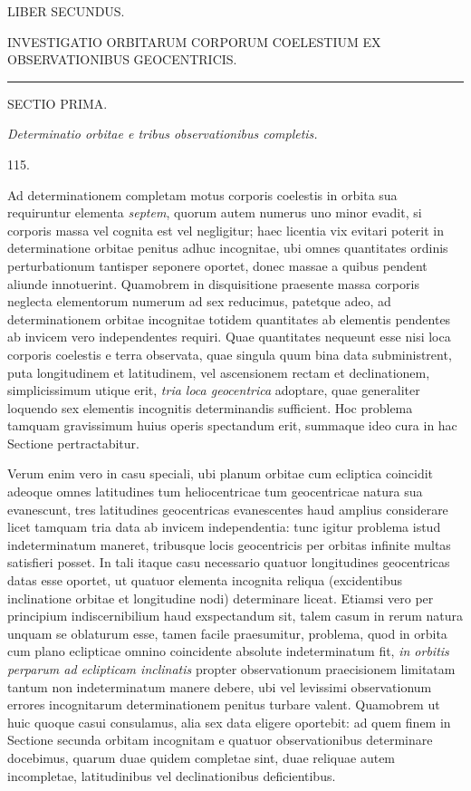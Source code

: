 \clearpage
{}
\begin{center}
{\Large LIBER SECUNDUS.}\par\bigskip
{\large INVESTIGATIO ORBITARUM CORPORUM COELESTIUM EX OBSERVATIONIBUS GEOCENTRICIS.}\par\bigskip
\rule{3em}{.3pt}\par\bigskip
{}
{\large SECTIO PRIMA.}\par\medskip
\emph{Determinatio orbitae e tribus observationibus completis.}\par\bigskip
\hypertarget{native-161-article115}{}115.
\end{center}
Ad determinationem completam motus corporis coelestis in orbita sua requiruntur elementa \emph{septem}, quorum autem numerus uno minor evadit, si corporis massa vel cognita est vel negligitur; haec licentia vix evitari poterit in determinatione orbitae penitus adhuc incognitae, ubi omnes quantitates ordinis perturbationum tantisper seponere oportet, donec massae a quibus pendent aliunde innotuerint. Quamobrem in disquisitione praesente massa corporis neglecta elementorum numerum ad sex reducimus, patetque adeo, ad determinationem orbitae incognitae totidem quantitates ab elementis pendentes ab invicem vero independentes requiri. Quae quantitates nequeunt esse nisi loca corporis coelestis e terra observata, quae singula quum bina data subministrent, puta longitudinem et latitudinem, vel ascensionem rectam et declinationem, simplicissimum utique erit, \emph{tria loca geocentrica} adoptare, quae generaliter loquendo sex elementis incognitis determinandis sufficient. Hoc problema tamquam gravissimum huius operis spectandum erit, summaque ideo cura in hac Sectione pertractabitur.

Verum enim vero in casu speciali, ubi planum orbitae cum ecliptica coincidit adeoque omnes latitudines tum heliocentricae tum geocentricae natura sua evanescunt, tres latitudines geocentricas evanescentes haud amplius considerare licet tamquam tria data ab invicem independentia: tunc igitur problema istud indeterminatum maneret, tribusque locis geocentricis per orbitas infinite multas satisfieri posset. In tali itaque casu necessario quatuor longitudines geocentricas datas esse oportet, ut quatuor elementa incognita reliqua (excidentibus inclinatione orbitae et longitudine nodi) determinare liceat. Etiamsi vero per principium indiscernibilium haud exspectandum sit, talem casum in rerum natura unquam se oblaturum esse, tamen facile praesumitur, problema, quod in orbita cum plano eclipticae omnino coincidente absolute indeterminatum fit, \emph{in orbitis perparum ad eclipticam inclinatis} propter observationum praecisionem limitatam tantum non indeterminatum manere debere, ubi vel levissimi observationum errores incognitarum determinationem penitus turbare valent. Quamobrem ut huic quoque casui consulamus, alia sex data eligere oportebit: ad quem finem in Sectione secunda orbitam incognitam e quatuor observationibus determinare docebimus, quarum duae quidem completae sint, duae reliquae autem incompletae, latitudinibus vel declinationibus deficientibus.

